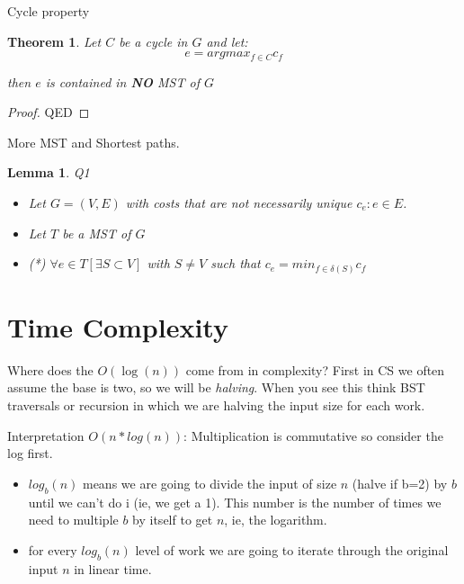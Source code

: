 \documentclass{article}
\newtheorem{theorem}{Theorem}
\newtheorem{lemma}{Lemma}
\begin{document}
\begin{greenbox}{Cycle property}
\begin{theorem}
Let $C$ be a cycle in $G$ and let:
\[ e = argmax_{f \in C} c_f\]

then $e$ is contained in \textbf{NO} MST of $G$
\end{theorem}
\end{greenbox}

\begin{proof}
QED
\end{proof}

More MST and Shortest paths. 

\begin{lemma} Q1
\begin{itemize}
\item Let $G = (V, E)$ with costs that are not necessarily unique $c_e : e \in E$. 
\item Let $T$ be a MST of $G$
\item (*) $\forall e \in T[\exists S \subset V]$ with $S\neq V$ such that $c_e = min_{f\in \delta(S)}c_f$
\end{itemize}
\end{lemma}


\section{Time Complexity}
Where does the $O(\log(n))$ come from in complexity?
First in CS we often assume the base is two, so we will be \textit{halving}. When you see this think BST traversals or recursion in which we are halving the input size for each work.

Interpretation $O(n*log(n))$: Multiplication is commutative so consider the log first. 
\begin{itemize}
\item $log_b(n)$ means we are going to divide the input of size $n$ (halve if b=2) by $b$ until we can't do i (ie, we get a 1). This number is the number of times we need to multiple $b$ by itself to get $n$, ie, the logarithm. 
\item for every $log_b(n)$ level of work we are going to iterate through the original input $n$ in linear time. 
\end{itemize}
\end{document}
